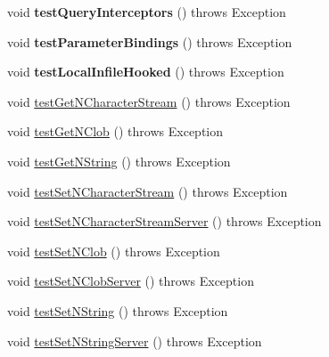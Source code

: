 \begin{DoxyCompactItemize}
\mbox{\label{classtestsuite_1_1simple_1_1_statements_test_ae7252e52fc20d0db0a50c625214014c5}} 
void {\bfseries test\+Query\+Interceptors} ()  throws Exception 
\item 
\mbox{\label{classtestsuite_1_1simple_1_1_statements_test_a3f282768eb4af0908972bed3c8ee8b94}} 
void {\bfseries test\+Parameter\+Bindings} ()  throws Exception 
\item 
\mbox{\label{classtestsuite_1_1simple_1_1_statements_test_a13a9b6c6aa50b52915b0476c28976c10}} 
void {\bfseries test\+Local\+Infile\+Hooked} ()  throws Exception 
\item 
void \mbox{\hyperlink{classtestsuite_1_1simple_1_1_statements_test_a53d8b06c4026d32f528f16fd1284b7ba}{test\+Get\+N\+Character\+Stream}} ()  throws Exception 
\item 
void \mbox{\hyperlink{classtestsuite_1_1simple_1_1_statements_test_a536b53923bd42d63d56f1105e13def2a}{test\+Get\+N\+Clob}} ()  throws Exception 
\item 
void \mbox{\hyperlink{classtestsuite_1_1simple_1_1_statements_test_a3901a8c1dff89f3d0ef056153855d1ed}{test\+Get\+N\+String}} ()  throws Exception 
\item 
void \mbox{\hyperlink{classtestsuite_1_1simple_1_1_statements_test_a38e65d199b2dae7aa98098c0c7c3424f}{test\+Set\+N\+Character\+Stream}} ()  throws Exception 
\item 
void \mbox{\hyperlink{classtestsuite_1_1simple_1_1_statements_test_ad1250f33b64cf0554fc2a5e779878e01}{test\+Set\+N\+Character\+Stream\+Server}} ()  throws Exception 
\item 
void \mbox{\hyperlink{classtestsuite_1_1simple_1_1_statements_test_a31aad5a1989e2b9189e57c75eea14e52}{test\+Set\+N\+Clob}} ()  throws Exception 
\item 
void \mbox{\hyperlink{classtestsuite_1_1simple_1_1_statements_test_a92f5e47200bc8ffaad2c183619802e81}{test\+Set\+N\+Clob\+Server}} ()  throws Exception 
\item 
void \mbox{\hyperlink{classtestsuite_1_1simple_1_1_statements_test_ad9dac6567ad8cfd19cc81d908c2d143b}{test\+Set\+N\+String}} ()  throws Exception 
\item 
void \mbox{\hyperlink{classtestsuite_1_1simple_1_1_statements_test_abec2b7d40eb32e7b87af7c38836b9917}{test\+Set\+N\+String\+Server}} ()  throws Exception 

\end{DoxyCompactItemize}
